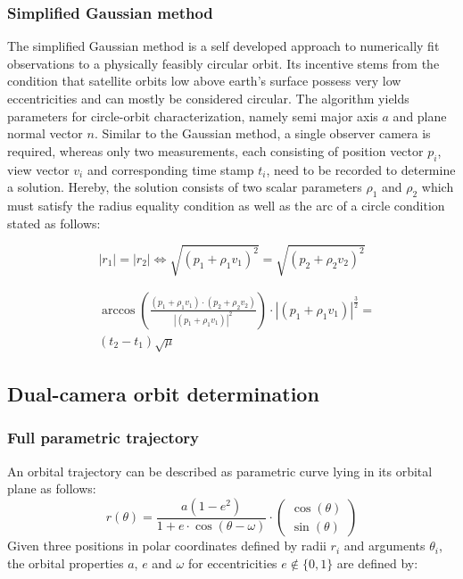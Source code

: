 \documentclass[10pt,a4paper]{article}
\begin{document}
	\subsubsection{Simplified Gaussian method}\label{sec:simplified_gauss_method}
	The simplified Gaussian method is a self developed approach to numerically fit observations to a physically feasibly circular orbit. Its incentive stems from the condition that satellite orbits low above earth's surface possess very low eccentricities and can mostly be considered circular. The algorithm yields parameters for circle-orbit characterization, namely semi major axis $a$ and plane normal vector $n$. \newline Similar to the Gaussian method, a single observer camera is required, whereas only two measurements, each consisting of position vector $p_i$, view vector $v_i$ and corresponding time stamp $t_i$, need to be recorded to determine a solution. Hereby, the solution consists of two scalar parameters $\rho_1$ and $\rho_2$ which must satisfy the radius equality condition as well as the arc of a circle condition stated as follows:
	
	\begin{equation}
		\label{circle_gauss_circle_condition}
		|r_1|=|r_2|\Leftrightarrow \sqrt{(p_1+\rho_1v_1)^2}=\sqrt{(p_2+\rho_2v_2)^2}
	\end{equation}

	
	\begin{equation}
		\label{circle_gauss_time_condition}
		\begin{aligned}
			&\arccos\left(\frac{(p_1+\rho_1v_1)\cdot (p_2+\rho_2v_2)}{|(p_1+\rho_1v_1)|^2}\right)\cdot|(p_1+\rho_1v_1)|^{\frac{3}{2}}=\\
			&(t_2-t_1)\sqrt{\mu}
		\end{aligned}
	\end{equation}
	\cite{orbit_determination_preliminary}
	
	\subsection{Dual-camera orbit determination}\label{sec:two_camera_determination}
	\subsubsection{Full parametric trajectory}\label{sec:full_parametric_trajectory}
	An orbital trajectory can be described as parametric curve lying in its orbital plane as follows: 
	\begin{equation}
		r(\theta)=\frac{a(1-e^2)}{1+e\cdot\cos(\theta-\omega)} \cdot \begin{pmatrix}
			\cos(\theta) \\
			\sin(\theta)
		\end{pmatrix}
	\end{equation}
	\noindent
	Given three positions in polar coordinates defined by radii $r_i$ and arguments $\theta_i$, the orbital properties $a$, $e$ and $\omega$ for eccentricities $e \notin \{0,1\}$ are defined by:
	
\end{document}

